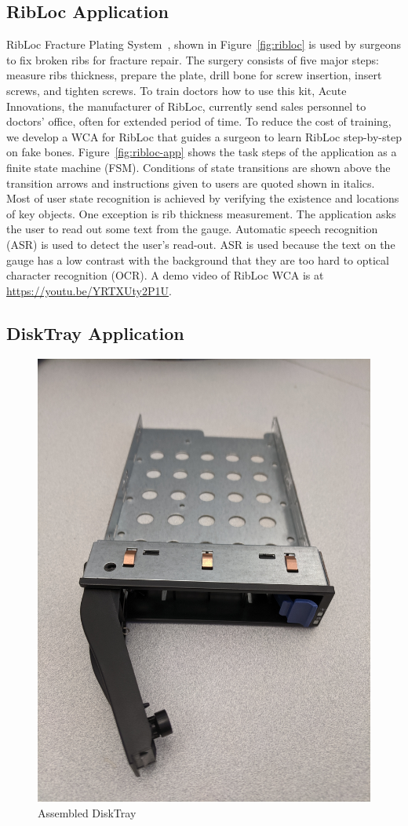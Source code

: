 \subsection{RibLoc Application}

RibLoc Fracture Plating System~\cite{ribloc}, shown in Figure~\ref{fig:ribloc}
is used by surgeons to fix broken ribs for fracture repair. The surgery
consists of five major steps: measure ribs thickness, prepare the plate, drill
bone for screw insertion, insert screws, and tighten screws. To train doctors
how to use this kit, Acute Innovations, the manufacturer of RibLoc, currently
send sales personnel to doctors' office, often for extended period of time. To
reduce the cost of training, we develop a WCA for RibLoc that guides a surgeon
to learn RibLoc step-by-step on fake bones. Figure~\ref{fig:ribloc-app} shows
the task steps of the application as a finite state machine (FSM). Conditions of
state transitions are shown above the transition arrows and instructions
given to users are quoted shown in italics.
Most of user
state recognition is achieved by verifying the existence and locations of key
objects. One exception is rib thickness measurement. The application asks the
user to read out some text from the gauge. Automatic speech recognition (ASR) is
used to detect the user's read-out. ASR is used because the text on the gauge
has a low contrast with the background that they are too hard to optical
character recognition (OCR). A demo video of RibLoc WCA is at
\url{https://youtu.be/YRTXUty2P1U}.

\subsection{DiskTray Application}

\begin{figure}
\centering
\includegraphics[width=0.3\linewidth]{FIGS/disktray.jpg}
\caption{\small Assembled DiskTray}
\label{fig:disktray}
\end{figure}

